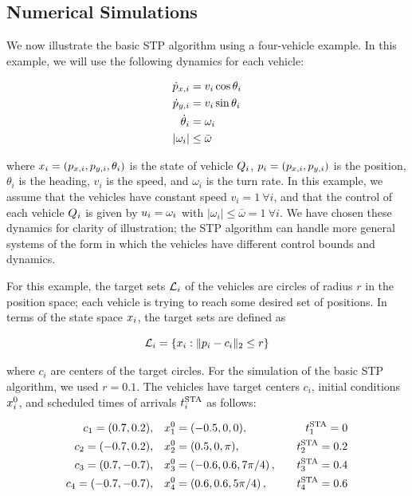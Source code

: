 \subsection{Numerical Simulations \label{sec:basic_results}}
We now illustrate the basic STP algorithm using a four-vehicle example. In this example, we will use the following dynamics for each vehicle:

\begin{equation} \label{eqn:NumSimpleDyn}
\begin{aligned}
\dot{\pos}_{x,i} &= v_i \cos\theta_i \\
\dot{\pos}_{y,i} &= v_i \sin\theta_i \\
\dot \theta_i &= \omega_i \\
|\omega_i| &\le \bar\omega
\end{aligned}
\end{equation}

\noindent where $x_i = (p_{x,i}, p_{y,i}, \theta_i)$ is the state of vehicle $Q_i$, $p_i = (p_{x,i}, p_{y,i})$ is the position, $\theta_i$ is the heading, $v_i$ is the speed, and $\omega_i$ is the turn rate. In this example, we assume that the vehicles have constant speed $v_i = 1 ~ \forall i$, and that the control of each vehicle $Q_i$ is given by $u_i = \omega_i$ with $|\omega_i| \le \bar\omega = 1 ~ \forall i$. We have chosen these dynamics for clarity of illustration; the STP algorithm can handle more general systems of the form in which the vehicles have different control bounds and dynamics. 

For this example, the target sets $\mathcal{L}_i$ of the vehicles are circles of radius $r$ in the position space; each vehicle is trying to reach some desired set of positions. In terms of the state space $x_i$, the target sets are defined as

\begin{equation}
\label{eq:target_sim}
\targetset_i = \{\state_i: \|\pos_i - c_i\|_2 \le r\}
\end{equation}

\noindent where $c_i$ are centers of the target circles. For the simulation of the basic STP algorithm, we used $r = 0.1$. The vehicles have target centers $c_i$, initial conditions $x_i^0$, and scheduled times of arrivals $t^\text{STA}_i$ as follows:

\begin{equation} \label{eqn:NumIC}
\begin{aligned}
c_1 = (0.7, 0.2), \quad& \state_1^0 = (-0.5, 0, 0), \quad & \sta_1 = 0 \\
c_2 = (-0.7, 0.2), \quad& \state_2^0 = (0.5, 0, \pi), \quad & \sta_2 = 0.2 \\
c_3 = (0.7, -0.7), \quad& \state_3^0 = \left(-0.6, 0.6, 7\pi/4\right), \quad & \sta_3 = 0.4\\
c_4 = (-0.7, -0.7), \quad & \state_4^0 = \left(0.6, 0.6, 5\pi/4\right), \quad & \sta_4 = 0.6
\end{aligned}
\end{equation}

